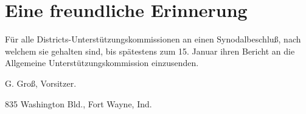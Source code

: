 \chapter[Eine freundliche Erinnerung]{Eine freundliche Erinnerung}

Für alle Districts-Unterstützungskommissionen an einen Synodalbeschluß, nach welchem sie gehalten sind, bis spätestens zum 15. Januar ihren Bericht an die Allgemeine Unterstützungskommission einzusenden.

G. Groß, Vorsitzer.

835 Washington Bld., Fort Wayne, Ind.
